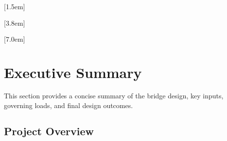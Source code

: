 \documentclass[12pt,a4paper]{report}
\numberwithin{table}{chapter}
\numberwithin{figure}{chapter}
\begin{document}
[1.5em]
  {\normalfont\vspace{2pt}}
  {\contentslabel{1.5em}}
  {\hspace*{-1.5em}}
  {\hfill\contentspage}

[3.8em]
  {\normalfont}
  {\contentslabel{2.3em}}
  {\hspace*{-2.3em}}
  {\hfill\contentspage}

[7.0em]
  {\normalfont}
  {\contentslabel{3.2em}}
  {\hspace*{-3.2em}}
  {\hfill\contentspage}

\newpage
\renewcommand{\contentsname}{\centering\Large\bfseries Table of Contents}
\tableofcontents


\chapter*{Executive Summary}

This section provides a concise summary of the bridge design, key inputs, governing loads, and final design outcomes.

\section*{Project Overview}
\label{sec:project-overview}
\end{document}
